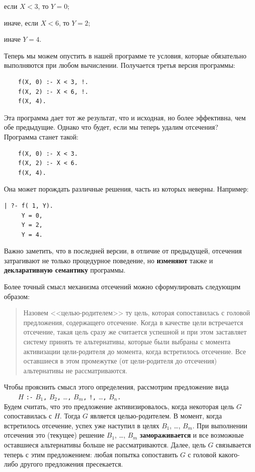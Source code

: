 \documentclass[12pt, openany, twoside]{book} %
\begin{document}
если $X < 3$, то $Y = 0$;

иначе, если $X < 6$, то $Y = 2$;

иначе $Y = 4$.

Теперь мы можем опустить в нашей программе те условия, которые обязательно выполняются при любом вычислении. Получается третья версия программы:
{\tt \begin{verbatim}
    f(X, 0) :- X < 3, !.
    f(X, 2) :- X < 6, !.
    f(X, 4).
\end{verbatim}}

\noindent Эта программа дает тот же результат, что и исходная, но более эффективна, чем обе предыдущие. Однако что будет, если мы теперь удалим отсечения? Программа станет такой:
{\tt \begin{verbatim}
    f(X, 0) :- X < 3.
    f(X, 2) :- X < 6.
    f(X, 4).
\end{verbatim}}
\noindent Она может порождать различные решения, часть из которых неверны. Например:

{\tt \begin{verbatim}
| ?- f( 1, Y).
     Y = 0,
     Y = 2,
     Y = 4.
 \end{verbatim}}

Важно заметить, что в последней версии, в отличие от предыдущей, отсечения затрагивают не только процедурное поведение, но {\bf изменяют} также и {\bf декларативную семантику} программы.

Более точный смысл механизма отсечений можно сформулировать следующим образом:
\begin{quote}
Назовем <<целью-родителем>> ту цель, которая сопоставилась с головой предложения, содержащего отсечение. Когда в качестве цели встречается отсечение, такая цель сразу же считается успешной и при этом заставляет систему принять те альтернативы, которые были выбраны с момента активизации цели-родителя до момента, когда встретилось отсечение. Все оставшиеся в этом промежутке (от цели-родителя до отсечения) альтернативы не рассматриваются.
\end{quote}

Чтобы прояснить смысл этого определения, рассмотрим предложение вида\\[1ex]
\verb|    |$H$ {\tt :-} $B_1${\tt,} $B_2${\tt,} \ldots {\tt ,} $B_m${\tt,}
    {\tt !,} \ldots {\tt ,} $B_n${\tt.}\\[-0.5ex]

\noindent Будем считать, что это предложение активизировалось, когда некоторая цель $G$ сопоставилась с $H$. Тогда $G$ является целью-родителем. В момент, когда встретилось отсечение, успех уже наступил в целях $B_1$, \ldots, $B_m$. При выполнении отсечения это (текущее) решение $B_1$, \ldots, $B_m$ {\bf замораживается} и все возможные оставшиеся альтернативы больше не рассматриваются. Далее, цель $G$ связывается теперь с этим предложением: любая попытка сопоставить $G$ с головой какого-либо другого предложения пресекается.
\end{document}
